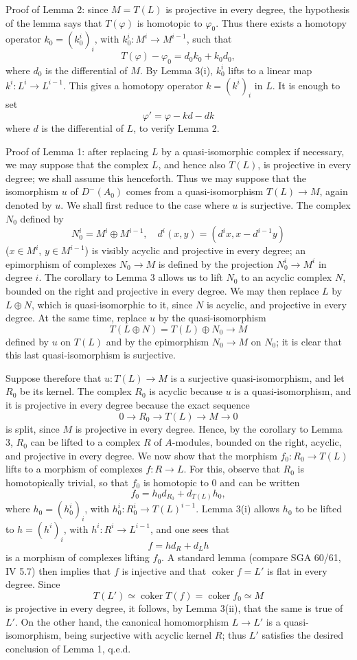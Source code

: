 \documentclass[11pt]{article}
\providecommand{\coker}{\operatorname{coker}}
\providecommand{\coker}{\operatorname{Coker}}
\begin{document}
Proof of Lemma 2: since $M=T(L)$ is projective in every degree, the hypothesis of the lemma says that $T(\varphi)$ is homotopic to $\varphi_0$. Thus there exists a homotopy operator $k_0=(k_0^i)_i$, with $k_0^i:M^i\to M^{i-1}$, such that
\[
T(\varphi)-\varphi_0=d_0k_0+k_0d_0,
\]
where $d_0$ is the differential of $M$. By Lemma 3(i), $k_0^i$ lifts to a linear map $k^i:L^i\to L^{i-1}$. This gives a homotopy operator $k=(k^i)_i$ in $L$. It is enough to set
\[
\varphi'=\varphi-kd-dk
\]
where $d$ is the differential of $L$, to verify Lemma 2.

Proof of Lemma 1: after replacing $L$ by a quasi-isomorphic complex if necessary, we may suppose that the complex $L$, and hence also $T(L)$, is projective in every degree; we shall assume this henceforth. Thus we may suppose that the isomorphism $u$ of $D^-(A_0)$ comes from a quasi-isomorphism $T(L)\to M$, again denoted by $u$. We shall first reduce to the case where $u$ is surjective. The complex $N_0$ defined by
\[
N_0^i=M^i\oplus M^{i-1},
\quad
 d^i(x,y)=(d^i x,x-d^{i-1}y)
\]
($x\in M^i$, $y\in M^{i-1}$) is visibly acyclic and projective in every degree; an epimorphism of complexes $N_0\to M$ is defined by the projection $N_0^i\to M^i$ in degree $i$. The corollary to Lemma 3 allows us to lift $N_0$ to an acyclic complex $N$, bounded on the right and projective in every degree. We may then replace $L$ by $L\oplus N$, which is quasi-isomorphic to it, since $N$ is acyclic, and projective in every degree. At the same time, replace $u$ by the quasi-isomorphism
\[
T(L\oplus N)=T(L)\oplus N_0\longrightarrow M
\]
defined by $u$ on $T(L)$ and by the epimorphism $N_0\to M$ on $N_0$; it is clear that this last quasi-isomorphism is surjective.

Suppose therefore that $u:T(L)\to M$ is a surjective quasi-isomorphism, and let $R_0$ be its kernel. The complex $R_0$ is acyclic because $u$ is a quasi-isomorphism, and it is projective in every degree because the exact sequence
\[
0\longrightarrow R_0\longrightarrow T(L)\longrightarrow M\longrightarrow0
\]
is split, since $M$ is projective in every degree. Hence, by the corollary to Lemma 3, $R_0$ can be lifted to a complex $R$ of $A$-modules, bounded on the right, acyclic, and projective in every degree. We now show that the morphism $f_0:R_0\to T(L)$ lifts to a morphism of complexes $f:R\to L$. For this, observe that $R_0$ is homotopically trivial, so that $f_0$ is homotopic to $0$ and can be written
\[
f_0=h_0d_{R_0}+d_{T(L)}h_0,
\]
where $h_0=(h_0^i)_i$, with $h_0^i:R_0^i\to T(L)^{i-1}$. Lemma 3(i) allows $h_0$ to be lifted to $h=(h^i)_i$, with $h^i:R^i\to L^{i-1}$, and one sees that
\[
f=hd_R+d_Lh
\]
is a morphism of complexes lifting $f_0$. A standard lemma (compare SGA 60/61, IV 5.7) then implies that $f$ is injective and that $\coker f=L'$ is flat in every degree. Since
\[
T(L')\simeq\coker T(f)=\coker f_0\simeq M
\]
is projective in every degree, it follows, by Lemma 3(ii), that the same is true of $L'$. On the other hand, the canonical homomorphism $L\to L'$ is a quasi-isomorphism, being surjective with acyclic kernel $R$; thus $L'$ satisfies the desired conclusion of Lemma 1, q.e.d.
\end{document}
